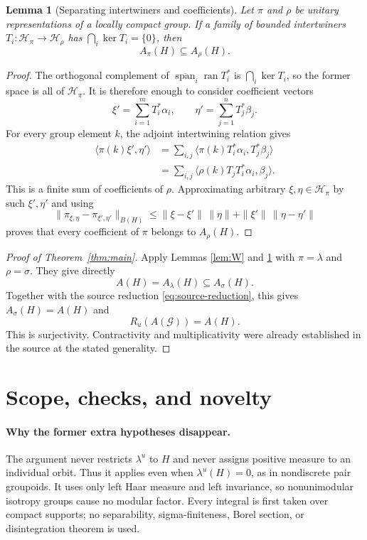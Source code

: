 \documentclass[11pt]{article}
\newtheorem{lemma}[theorem]{Lemma}
\theoremstyle{remark}
\newcommand{\G}{\mathcal G}
\newcommand{\Hil}{\mathcal H}
\newcommand{\ran}{\operatorname{ran}}
\begin{document}
\begin{lemma}[Separating intertwiners and coefficients]\label{lem:coefficients}
Let $\pi$ and $\rho$ be unitary representations of a locally compact group.
If a family of bounded intertwiners $T_i:\Hil_\pi\to\Hil_\rho$ has
$\bigcap_i\ker T_i=\{0\}$, then
\[
                         A_\pi(H)\subseteq A_\rho(H).
\]
\end{lemma}

\begin{proof}
The orthogonal complement of
$\overline{\operatorname{span}}_i\ran T_i^*$ is $\bigcap_i\ker T_i$, so the
former space is all of $\Hil_\pi$. It is therefore enough to consider
coefficient vectors
\[
       \xi'=\sum_{i=1}^mT_i^*\alpha_i,
       \qquad \eta'=\sum_{j=1}^nT_j^*\beta_j.
\]
For every group element $k$, the adjoint intertwining relation gives
\begin{align*}
 \langle\pi(k)\xi',\eta'\rangle
 &=\sum_{i,j}\langle\pi(k)T_i^*\alpha_i,T_j^*\beta_j\rangle\\
 &=\sum_{i,j}\langle\rho(k)T_jT_i^*\alpha_i,\beta_j\rangle.
\end{align*}
This is a finite sum of coefficients of $\rho$. Approximating arbitrary
$\xi,\eta\in\Hil_\pi$ by such $\xi',\eta'$ and using
\[
 \|\pi_{\xi,\eta}-\pi_{\xi',\eta'}\|_{B(H)}
 \leq \|\xi-\xi'\|\,\|\eta\|+\|\xi'\|\,\|\eta-\eta'\|
\]
proves that every coefficient of $\pi$ belongs to $A_\rho(H)$.
\end{proof}

\begin{proof}[Proof of Theorem~\ref{thm:main}]
Apply Lemmas \ref{lem:W} and \ref{lem:coefficients} with $\pi=\lambda$ and
$\rho=\sigma$. They give directly
\[
           A(H)=A_\lambda(H)\subseteq A_\sigma(H).
\]
Together with the source reduction \eqref{eq:source-reduction}, this gives
$A_\sigma(H)=A(H)$ and
\[
           R_u(A(\G))=A(H).
\]
This is surjectivity. Contractivity and multiplicativity were already
established in the source at the stated generality.
\end{proof}

\section{Scope, checks, and novelty}

\paragraph{Why the former extra hypotheses disappear.}
The argument never restricts $\lambda^u$ to $H$ and never assigns positive
measure to an individual orbit.  Thus it applies even when
$\lambda^u(H)=0$, as in nondiscrete pair groupoids.  It uses only left Haar
measure and left invariance, so nonunimodular isotropy groups cause no modular
factor.  Every integral is first taken over compact supports; no separability,
sigma-finiteness, Borel section, or disintegration theorem is used.
\end{document}
